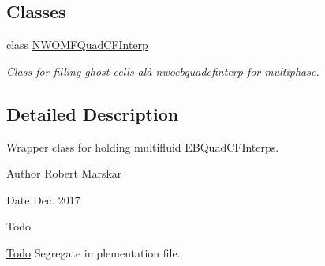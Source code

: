 \subsection*{Classes}
\begin{DoxyCompactItemize}
\item 
class \hyperlink{classNWOMFQuadCFInterp}{N\+W\+O\+M\+F\+Quad\+C\+F\+Interp}
\begin{DoxyCompactList}\small\item\em Class for filling ghost cells alà nwoebquadcfinterp for multiphase. \end{DoxyCompactList}\end{DoxyCompactItemize}


\subsection{Detailed Description}
Wrapper class for holding multifluid E\+B\+Quad\+C\+F\+Interps. 

\begin{DoxyAuthor}{Author}
Robert Marskar 
\end{DoxyAuthor}
\begin{DoxyDate}{Date}
Dec. 2017 
\end{DoxyDate}
\begin{DoxyRefDesc}{Todo}
\item[\hyperlink{todo__todo000007}{Todo}]Segregate implementation file. \end{DoxyRefDesc}
